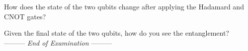 \documentclass[a4paper,12pt,fleqn]{article}
\newcommand{\lastwords}{End of Examination}
\begin{document}
\begin{center}
\newpage 


How does the state of the two qubits change after applying the Hadamard and CNOT gates? \\

\vspace{3cm}

Given the final state of the two qubits, how do you see the entanglement? \\

\newpage
\vspace{1cm}
    --------- \textit{\lastwords} ---------
    \end{center}
    
    \label{finalpage}
    
\end{document}
